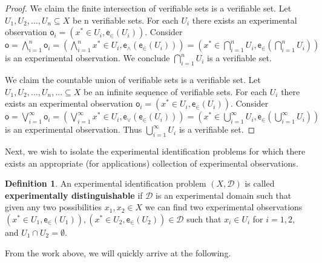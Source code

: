 \documentclass[review]{elsarticle}
\theoremstyle{plain}%
\theoremstyle{definition}
\newtheorem{defn}{Definition}[section]
\theoremstyle{remark}
\begin{document}
\begin{proof}
	We claim the finite intersection of verifiable sets is a verifiable set. Let $U_1, U_2, ... , U_n \subseteq X$ be n verifiable sets. For each $U_i$ there exists an experimental observation $\mathsf{o}_i = (x^*\in U_i, \mathsf{e}_\in(U_i))$. Consider $\mathsf{o} = \bigwedge\limits_{i=1}^{n} \mathsf{o}_i = (\bigwedge\limits_{i=1}^{n} x^*\in U_i , \mathsf{e}_{\wedge}(\mathsf{e}_\in(U_i)))=( x^*\in \bigcap\limits_{i=1}^{n} U_i, \mathsf{e}_\in(\bigcap\limits_{i=1}^{n} U_i))$ is an experimental observation. We conclude $\bigcap\limits_{i=1}^{n} U_i$ is a verifiable set.
	
	We claim the countable union of verifiable sets is a verifiable set. Let $U_1, U_2, ... , U_n, ... \subseteq X$ be an infinite sequence of verifiable sets. For each $U_i$ there exists an experimental observation $\mathsf{o}_i = (x^*\in U_i, \mathsf{e}_\in(U_i))$. Consider $\mathsf{o} = \bigvee\limits_{i=1}^{\infty} \mathsf{o}_i = (\bigvee\limits_{i=1}^{\infty} x^*\in U_i, \mathsf{e}_{\vee}(\mathsf{e}_\in(U_i)))=( x^*\in \bigcup\limits_{i=1}^{\infty} U_i, \mathsf{e}_\in(\bigcup\limits_{i=1}^{\infty} U_i))$ is an experimental observation. Thus $\bigcup\limits_{i=1}^{\infty} U_i$ is a verifiable set.
\end{proof}

Next, we wish to isolate the experimental identification problems for which there exists an appropriate (for applications) collection of experimental observations. 

\begin{defn}
An experimental identification problem $(X,\mathcal{D})$ is called \textbf{experimentally distinguishable} if $\mathcal{D}$ is an experimental domain such that given any two possibilities $x_1, x_2 \in X$ we can find two experimental observations $(x^*\in U_1, \mathsf{e}_\in(U_1)), (x^*\in U_2, \mathsf{e}_\in(U_2))\in\mathcal{D}$ such that $x_i\in U_i$ for $i=1,2$, and $U_1\cap U_2 = \emptyset$. 
\end{defn}

From the work above, we will quickly arrive at the following.
\end{document}
